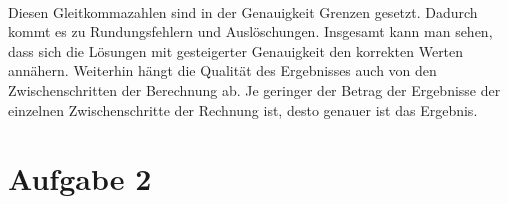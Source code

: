 \documentclass{article}
\begin{document}
\noindent
{}
\\

Diesen Gleitkommazahlen sind in der Genauigkeit Grenzen gesetzt. Dadurch kommt es zu Rundungsfehlern und
Auslöschungen.
Insgesamt kann man sehen, dass sich die Lösungen mit gesteigerter Genauigkeit den korrekten Werten annähern.
Weiterhin hängt die Qualität des Ergebnisses auch von den Zwischenschritten der Berechnung ab. 
Je geringer der Betrag der Ergebnisse der einzelnen Zwischenschritte der Rechnung ist, desto
genauer ist das Ergebnis.

\pagebreak
\section*{Aufgabe 2}
\end{document}
